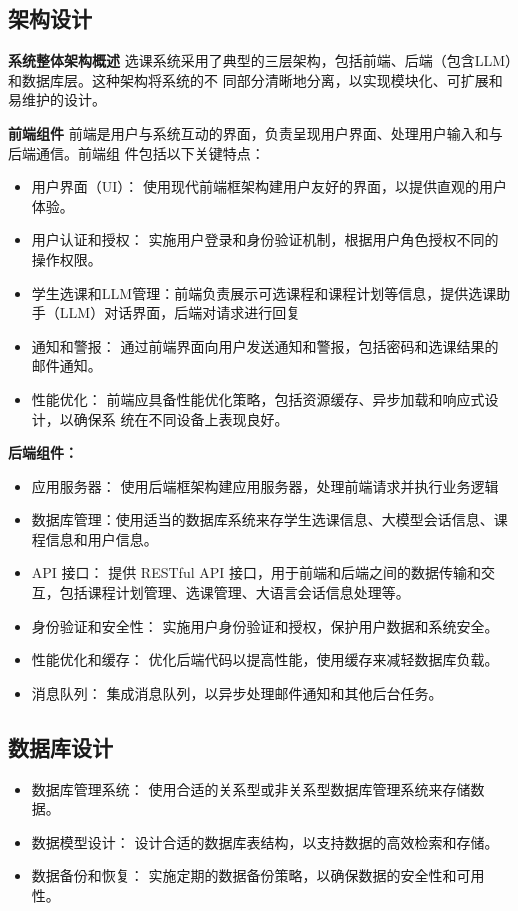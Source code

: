 \documentclass{article}
\begin{document}
\subsection{架构设计}
\textbf{系统整体架构概述}
选课系统采用了典型的三层架构，包括前端、后端（包含LLM）和数据库层。这种架构将系统的不
同部分清晰地分离，以实现模块化、可扩展和易维护的设计。


\textbf{前端组件}
前端是用户与系统互动的界面，负责呈现用户界面、处理用户输入和与后端通信。前端组
件包括以下关键特点：
\begin{itemize}
  \item 用户界面（UI）： 使用现代前端框架构建用户友好的界面，以提供直观的用户体验。
  \item 用户认证和授权： 实施用户登录和身份验证机制，根据用户角色授权不同的操作权限。
  \item 学生选课和LLM管理：前端负责展示可选课程和课程计划等信息，提供选课助手（LLM）对话界面，后端对请求进行回复
  \item 通知和警报： 通过前端界面向用户发送通知和警报，包括密码和选课结果的邮件通知。
  \item 性能优化： 前端应具备性能优化策略，包括资源缓存、异步加载和响应式设计，以确保系
        统在不同设备上表现良好。
\end{itemize}

\textbf{后端组件：}
\begin{itemize}
  \item 应用服务器： 使用后端框架构建应用服务器，处理前端请求并执行业务逻辑
  \item 数据库管理：使用适当的数据库系统来存学生选课信息、大模型会话信息、课程信息和用户信息。
  \item API 接口： 提供 RESTful API 接口，用于前端和后端之间的数据传输和交互，包括课程计划管理、选课管理、大语言会话信息处理等。
  \item 身份验证和安全性： 实施用户身份验证和授权，保护用户数据和系统安全。
  \item 性能优化和缓存： 优化后端代码以提高性能，使用缓存来减轻数据库负载。
  \item 消息队列： 集成消息队列，以异步处理邮件通知和其他后台任务。
\end{itemize}

\subsection{数据库设计}
\begin{itemize}
  \item 数据库管理系统： 使用合适的关系型或非关系型数据库管理系统来存储数据。
  \item 数据模型设计： 设计合适的数据库表结构，以支持数据的高效检索和存储。
  \item 数据备份和恢复： 实施定期的数据备份策略，以确保数据的安全性和可用性。
\end{itemize}
\end{document}
